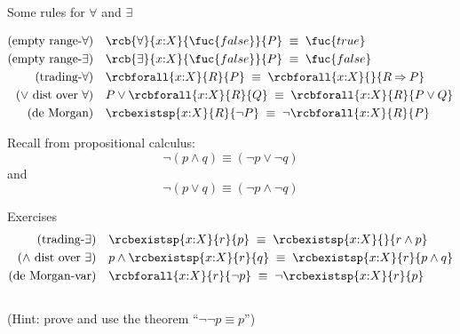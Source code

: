 \documentclass{beamer}
\def\true{\fuc{true}}
\def\false{\fuc{false}}
\def\dimp{\mathbin{\equiv}}
\def\imp{\mathbin{\Rightarrow}}
\def\e{\mathbin{\wedge}}
\def\ou{\mathbin{\vee}}
\begin{document}
\begin{slide}{Some rules for $\forall$ and $\exists$}

\begin{align*}
\text{(empty range-$\forall$)} && & \rcb{\forall}{x{:}X}{\false}{P} ~\dimp~ \true\\
\text{(empty range-$\exists$)} && & \rcb{\exists}{x{:}X}{\false}{P} ~\dimp~ \false\\
\text{(trading-$\forall$)} && & \rcbforall{x{:}X}{R}{P} ~\dimp~ \rcbforall{x{:}X}{}{R \imp P}\\
\text{($\ou$ dist over $\forall$)} && & P \ou \rcbforall{x{:}X}{R}{Q} ~\dimp~ \rcbforall{x{:}X}{R}{P \ou Q}\\
\text{(de Morgan)} && & \rcbexistsp{x{:}X}{R}{\neg P} ~\dimp~ \neg \rcbforall{x{:}X}{R}{P}
\end{align*}

\begin{block}{Recall  from propositional calculus:}
$$
\neg (p \e q) \dimp (\neg p \ou \neg q)
$$
and
$$
\neg (p \ou q) \dimp (\neg p \e \neg q)
$$
\end{block}
\end{slide}
%


\begin{slide}{Exercises}
\begin{align*}
\text{(trading-$\exists$)} && & \rcbexistsp{x{:}X}{r}{p} ~\dimp~ \rcbexistsp{x{:}X}{}{r \land p}
\\
\text{($\e$ dist over $\exists$)} && & p \e \rcbexistsp{x{:}X}{r}{q} ~\dimp~ \rcbexistsp{x{:}X}{r}{p \e q}
\\
\text{(de Morgan-var)} && & \rcbforall{x{:}X}{r}{\neg p} ~\dimp~ \neg \rcbexistsp{x{:}X}{r}{p}
\end{align*}
%
\\[10mm]
(Hint: prove and use the theorem ``$\lnot\lnot p \dimp p$'')
\end{slide}
\end{document}
